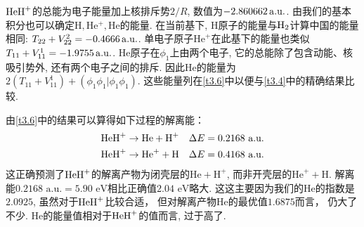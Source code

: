 $\mathrm{HeH}^+$的总能为电子能量加上核排斥势$2/R$, 数值为$-2.860662\,\mathrm{a.u.}$. 
由我们的基本积分也可以确定$\mathrm{H,He^+,He}$的能量. 
在当前基下, $\mathrm{H}$原子的能量与$\mathrm{H}_2$计算中国的能量相同: $T_{22}+V_{22}^2=-0.4666\,\mathrm{a.u.}$. 
单电子原子$\mathrm{He}^+$在此基下的能量也类似$T_{11}+V_{11}^1=-1.9755\,\mathrm{a.u.}$. 
$\mathrm{He}$原子在$\phi_1$上由两个电子, 它的总能除了包含动能、核吸引势外, 还有两个电子之间的排斥. 
因此$\mathrm{He}$的能量为$2(T_{11}+V_{11}^1)+(\phi_1\phi_1|\phi_1\phi_1)$. 
这些能量列在\autoref{t3.6}中以便与\autoref{t3.4}中的精确结果比较.

由\autoref{t3.6}中的结果可以算得如下过程的解离能：
\begin{align}
	\mathrm{HeH}^+ & \to \text{He} + \text{H}^+ \quad \Delta E = 0.2168\,\, \text{a.u.}\\
	\mathrm{HeH}^+ & \to \text{He}^+ + \text{H} \quad \Delta E = 0.4168\,\, \text{a.u.}
\end{align}
这正确预测了$\mathrm{HeH}^+$的解离产物为闭壳层的$\text{He}+\text{H}^+$, 
而非开壳层的$\text{He}^++\text{H}$. 
解离能$0.2168\,\,\text{a.u.}=5.90\,\,\text{eV}$相比正确值$2.04\,\,\text{eV}$略大.
这这主要因为我们的$\text{He}$的指数是$2.0925$, 
虽然对于$\mathrm{HeH}^+$比较合适， 
但对解离产物$\text{He}$的最优值$1.6875$而言，
仍大了不少. 
$\text{He}$的能量值相对于$\mathrm{HeH}^+$的值而言, 
过于高了.

